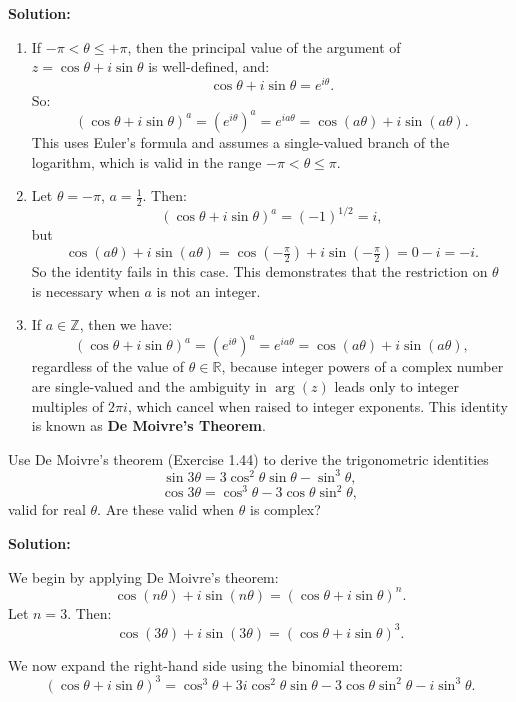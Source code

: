 \textbf{Solution:}

\begin{enumerate}[label=\roman*)]

\item If \( -\pi < \theta \leq +\pi \), then the principal value of the argument of \( z = \cos \theta + i \sin \theta \) is well-defined, and:
\[
\cos \theta + i \sin \theta = e^{i \theta}.
\]
So:
\[
(\cos \theta + i \sin \theta)^a = \left( e^{i \theta} \right)^a = e^{i a \theta} = \cos(a\theta) + i \sin(a\theta).
\]
This uses Euler’s formula and assumes a single-valued branch of the logarithm, which is valid in the range \( -\pi < \theta \leq \pi \).

\item Let \( \theta = -\pi \), \( a = \tfrac{1}{2} \). Then:
\[
(\cos \theta + i \sin \theta)^a = (-1)^{1/2} = i,
\]
but
\[
\cos(a\theta) + i \sin(a\theta) = \cos(-\tfrac{\pi}{2}) + i \sin(-\tfrac{\pi}{2}) = 0 - i = -i.
\]
So the identity fails in this case. This demonstrates that the restriction on \( \theta \) is necessary when \( a \) is not an integer.

\item If \( a \in \mathbb{Z} \), then we have:
\[
(\cos \theta + i \sin \theta)^a = \left( e^{i \theta} \right)^a = e^{i a \theta} = \cos(a \theta) + i \sin(a \theta),
\]
regardless of the value of \( \theta \in \mathbb{R} \), because integer powers of a complex number are single-valued and the ambiguity in \( \arg(z) \) leads only to integer multiples of \( 2\pi i \), which cancel when raised to integer exponents. This identity is known as \textbf{De Moivre’s Theorem}.
\end{enumerate}

\begin{problembox}
Use De Moivre’s theorem (Exercise 1.44) to derive the trigonometric identities
\[
\sin 3\theta = 3 \cos^2 \theta \sin \theta - \sin^3 \theta,
\]
\[
\cos 3\theta = \cos^3 \theta - 3 \cos \theta \sin^2 \theta,
\]
valid for real \( \theta \). Are these valid when \( \theta \) is complex?
\end{problembox}

\textbf{Solution:}

We begin by applying De Moivre’s theorem:
\[
\cos(n\theta) + i \sin(n\theta) = (\cos \theta + i \sin \theta)^n.
\]
Let \( n = 3 \). Then:
\[
\cos(3\theta) + i \sin(3\theta) = (\cos \theta + i \sin \theta)^3.
\]

We now expand the right-hand side using the binomial theorem:
\[
(\cos \theta + i \sin \theta)^3 = \cos^3 \theta + 3i \cos^2 \theta \sin \theta - 3 \cos \theta \sin^2 \theta - i \sin^3 \theta.
\]

